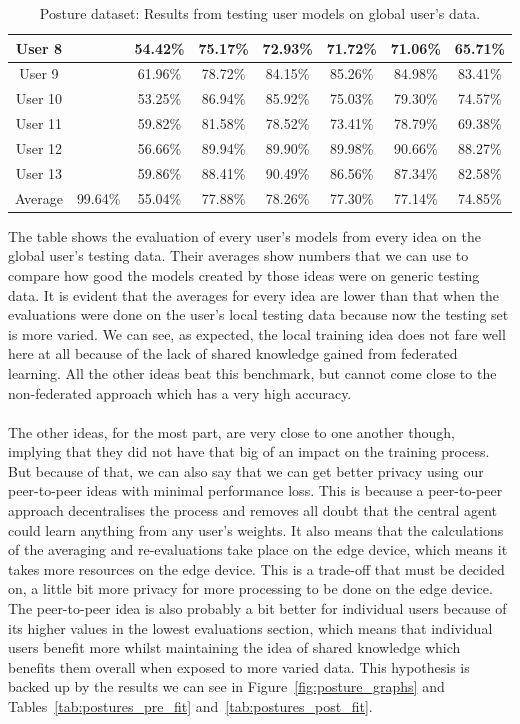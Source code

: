 \documentclass[12pt]{article}
\begin{document}
\begin{table}[H]
{\begin{tabular}{|c|c|c|c|c|c|c|c|}
\hline
User 8 &  & 54.42\% & 75.17\% & 72.93\% & 71.72\% & 71.06\% & 65.71\%\\
\hline
User 9 &  & 61.96\% & 78.72\% & 84.15\% & 85.26\% & 84.98\% & 83.41\%\\
\hline
User 10 &  & 53.25\% & 86.94\% & 85.92\% & 75.03\% & 79.30\% & 74.57\%\\
\hline
User 11 &  & 59.82\% & 81.58\% & 78.52\% & 73.41\% & 78.79\% & 69.38\%\\
\hline
User 12 &  & 56.66\% & 89.94\% & 89.90\% & 89.98\% & 90.66\% & 88.27\%\\
\hline
User 13 &  & 59.86\% & 88.41\% & 90.49\% & 86.56\% & 87.34\% & 82.58\%\\
\hline
Average & 99.64\% & 55.04\% & 77.88\% & 78.26\% & 77.30\% & 77.14\% & 74.85\%\\
\hline
\end{tabular}}
\caption{Posture dataset: Results from testing user models on global user's data.} \label{tab:postures_on_global_user}
\end{table}
\noindent The table shows the evaluation of every user's models from every idea on the global user's testing data. Their averages show numbers that we can use to compare how good the models created by those ideas were on generic testing data. It is evident that the averages for every idea are lower than that when the evaluations were done on the user's local testing data because now the testing set is more varied. We can see, as expected, the local training idea does not fare well here at all because of the lack of shared knowledge gained from federated learning. All the other ideas beat this benchmark, but cannot come close to the non-federated approach which has a very high accuracy. 
\\\\
The other ideas, for the most part, are very close to one another though, implying that they did not have that big of an impact on the training process. But because of that, we can also say that we can get better privacy using our peer-to-peer ideas with minimal performance loss. This is because a peer-to-peer approach decentralises the process and removes all doubt that the central agent could learn anything from any user's weights. It also means that the calculations of the averaging and re-evaluations take place on the edge device, which means it takes more resources on the edge device. This is a trade-off that must be decided on, a little bit more privacy for more processing to be done on the edge device. The peer-to-peer idea is also probably a bit better for individual users because of its higher values in the lowest evaluations section, which means that individual users benefit more whilst maintaining the idea of shared knowledge which benefits them overall when exposed to more varied data. This hypothesis is backed up by the results we can see in Figure~\ref{fig:posture_graphs} and Tables~\ref{tab:postures_pre_fit} and~\ref{tab:postures_post_fit}.
\end{document}

